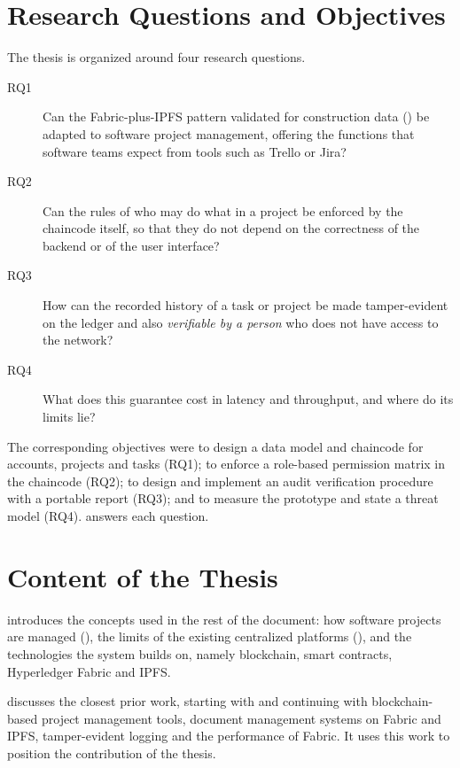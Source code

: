 \section{Research Questions and Objectives}
\label{sec:rqs}

The thesis is organized around four research questions.

\begin{description}
    \item[RQ1] Can the Fabric-plus-IPFS pattern validated for construction data () be adapted to software project management, offering the functions that software teams expect from tools such as Trello or Jira?
    \item[RQ2] Can the rules of who may do what in a project be enforced by the chaincode itself, so that they do not depend on the correctness of the backend or of the user interface?
    \item[RQ3] How can the recorded history of a task or project be made tamper-evident on the ledger and also \emph{verifiable by a person} who does not have access to the network?
    \item[RQ4] What does this guarantee cost in latency and throughput, and where do its limits lie?
\end{description}

The corresponding objectives were to design a data model and chaincode for accounts, projects and tasks (RQ1); to enforce a role-based permission matrix in the chaincode (RQ2); to design and implement an audit verification procedure with a portable report (RQ3); and to measure the prototype and state a threat model (RQ4).  answers each question.

\section{Content of the Thesis}
\label{sec:content}

 introduces the concepts used in the rest of the document: how software projects are managed (), the limits of the existing centralized platforms (), and the technologies the system builds on, namely blockchain, smart contracts, Hyperledger Fabric and IPFS.

 discusses the closest prior work, starting with \textcite{adel2023} and continuing with blockchain-based project management tools, document management systems on Fabric and IPFS, tamper-evident logging and the performance of Fabric. It uses this work to position the contribution of the thesis.

